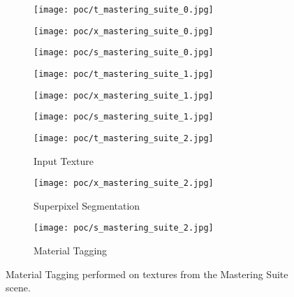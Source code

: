 \begin{figure}
    \centering
    \begin{subfigure}[t]{0.3\textwidth}
       \centering
       \texttt{[image: poc/t\_mastering\_suite\_0.jpg]}

    \end{subfigure}
    \begin{subfigure}[t]{0.3\textwidth}
       \centering
       \texttt{[image: poc/x\_mastering\_suite\_0.jpg]}

    \end{subfigure}
    \begin{subfigure}[t]{0.3\textwidth}
        \centering
        \texttt{[image: poc/s\_mastering\_suite\_0.jpg]}
     \end{subfigure}


    \addvspace{\baselineskip}


    \centering
    \begin{subfigure}[t]{0.3\textwidth}
       \centering
       \texttt{[image: poc/t\_mastering\_suite\_1.jpg]}

    \end{subfigure}
    \begin{subfigure}[t]{0.3\textwidth}
       \centering
       \texttt{[image: poc/x\_mastering\_suite\_1.jpg]}

    \end{subfigure}
    \begin{subfigure}[t]{0.3\textwidth}
        \centering
        \texttt{[image: poc/s\_mastering\_suite\_1.jpg]}
     \end{subfigure}


    \addvspace{\baselineskip}

    
    \centering
    \begin{subfigure}[t]{0.3\textwidth}
       \centering
       \texttt{[image: poc/t\_mastering\_suite\_2.jpg]}
       \caption{Input Texture}
    \end{subfigure}
    \begin{subfigure}[t]{0.3\textwidth}
       \centering
       \texttt{[image: poc/x\_mastering\_suite\_2.jpg]}
       \caption{Superpixel Segmentation}
    \end{subfigure}
    \begin{subfigure}[t]{0.3\textwidth}
        \centering
        \texttt{[image: poc/s\_mastering\_suite\_2.jpg]}
        \caption{Material Tagging}
     \end{subfigure}
 

\caption{Material Tagging performed on textures from the Mastering Suite scene.}
\label{fig:mastering-suite-superpixels}
\end{figure}

